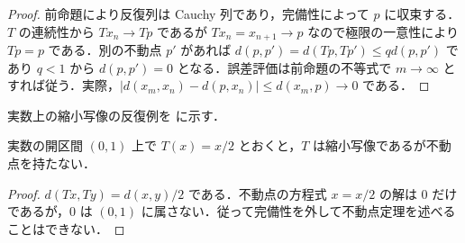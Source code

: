 \begin{proof}
前命題により反復列は Cauchy 列であり，完備性によって $p$ に収束する．$T$ の連続性から $Tx_n\to Tp$ であるが $Tx_n=x_{n+1}\to p$ なので極限の一意性により $Tp=p$ である．別の不動点 $p'$ があれば $d(p,p')=d(Tp,Tp')\leq qd(p,p')$ であり $q<1$ から $d(p,p')=0$ となる．誤差評価は前命題の不等式で $m\to\infty$ とすれば従う．実際，$|d(x_m,x_n)-d(p,x_n)|\leq d(x_m,p)\to0$ である．
\end{proof}
実数上の縮小写像の反復例を  に示す．
\begin{example}[完備性を欠く場合の反例]
実数の開区間 $(0,1)$ 上で $T(x)=x/2$ とおくと，$T$ は縮小写像であるが不動点を持たない．
\end{example}
\begin{proof}
$d(Tx,Ty)=d(x,y)/2$ である．不動点の方程式 $x=x/2$ の解は $0$ だけであるが，$0$ は $(0,1)$ に属さない．従って完備性を外して不動点定理を述べることはできない．
\end{proof}
